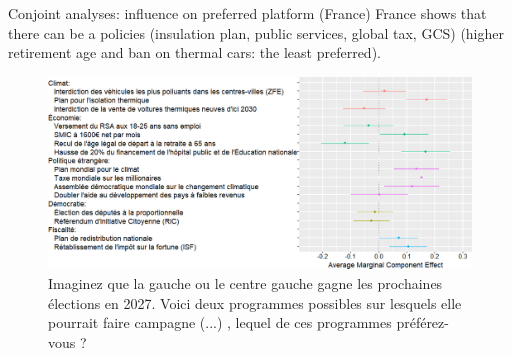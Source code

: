 \begin{framefont}{\small}
\begin{frame}{Conjoint analyses: influence on preferred platform (France)\label{}} 
	\vspace{-.2cm}
    \bbvs \ip France shows that there can be a  policies (insulation plan, public services, global tax, GCS)  (higher retirement age and ban on thermal cars: the least preferred).
    \ee
    \begin{figure}\vspace{-.4cm}
        \centering 
        \caption{Imaginez que la gauche ou le centre gauche gagne les prochaines élections en 2027. Voici deux programmes possibles sur lesquels elle pourrait faire campagne (...)%
		, lequel de ces programmes préférez-vous ?}
        \vspace{-.2cm} 
        \includegraphics[height=.7\textheight]{../figures/FR/ca_r.png} 
    \end{figure}
\end{frame}


\end{framefont}
